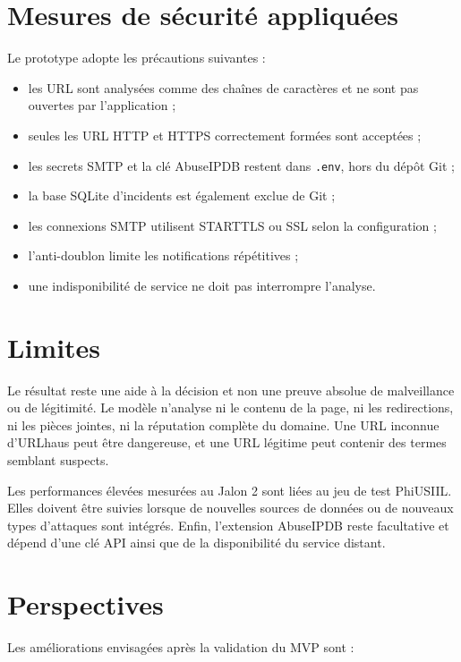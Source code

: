 \documentclass[11pt,a4paper]{report}
\begin{document}
\section{Mesures de sécurité appliquées}

Le prototype adopte les précautions suivantes :

\begin{itemize}
  \item les URL sont analysées comme des chaînes de caractères et ne sont pas
        ouvertes par l'application ;
  \item seules les URL HTTP et HTTPS correctement formées sont acceptées ;
  \item les secrets SMTP et la clé AbuseIPDB restent dans \texttt{.env}, hors
        du dépôt Git ;
  \item la base SQLite d'incidents est également exclue de Git ;
  \item les connexions SMTP utilisent STARTTLS ou SSL selon la configuration ;
  \item l'anti-doublon limite les notifications répétitives ;
  \item une indisponibilité de service ne doit pas interrompre l'analyse.
\end{itemize}

\section{Limites}

Le résultat reste une aide à la décision et non une preuve absolue de
malveillance ou de légitimité. Le modèle n'analyse ni le contenu de la page,
ni les redirections, ni les pièces jointes, ni la réputation complète du
domaine. Une URL inconnue d'URLhaus peut être dangereuse, et une URL
légitime peut contenir des termes semblant suspects.

Les performances élevées mesurées au Jalon 2 sont liées au jeu de test
PhiUSIIL. Elles doivent être suivies lorsque de nouvelles sources de données
ou de nouveaux types d'attaques sont intégrés. Enfin, l'extension AbuseIPDB
reste facultative et dépend d'une clé API ainsi que de la disponibilité du
service distant.

\section{Perspectives}

Les améliorations envisagées après la validation du MVP sont :
\end{document}
